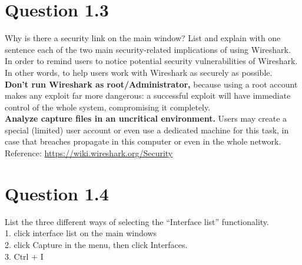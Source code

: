 \documentclass{article}
\newenvironment{homeworkProblem}[1]{
	\section*{#1}
	}{
}
\begin{document}
\begin{homeworkProblem}{Question 1.3}
Why is there a security link on the main window? List and explain with one sentence each of the two main security-related implications of using Wireshark.\\

In order to remind users to notice potential security vulnerabilities of Wireshark. In other words, to help users work with Wireshark as securely as possible.\\

\textbf{Don't run Wireshark as root/Administrator,} because using a root account makes any exploit far more dangerous: a successful exploit will have immediate control of the whole system, compromising it completely.\\

\textbf{Analyze capture files in an uncritical environment.} Users may create a special (limited) user account or even use a dedicated machine for this task, in case that breaches propagate in this computer or even in the whole network.\\

Reference: \url{https://wiki.wireshark.org/Security}
\end{homeworkProblem}


\begin{homeworkProblem}{Question 1.4}
List the three different ways of selecting the ``Interface list'' functionality.\\

1. click interface list on the main windows\\
2. click Capture in the menu, then click Interfaces.\\
3. Ctrl + I
\end{homeworkProblem}

\end{document}
